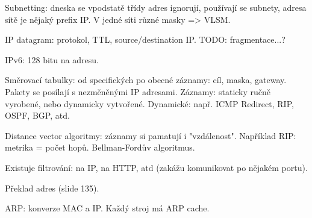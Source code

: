 \documentclass[a4paper,10pt,titlepage]{article} \usepackage[utf8]{inputenc}
\begin{document}
Subnetting: dneska se vpodstatě třídy adres ignorují, používají se subnety,
adresa sítě je nějaký prefix IP. V jedné síti různé masky => VLSM.

IP datagram: protokol, TTL, source/destination IP.
TODO: fragmentace...?

IPv6: 128 bitu na adresu.

Směrovací tabulky: od specifických po obecné záznamy: cíl, maska, gateway.
Pakety se posílají s nezměněnými IP adresami.
Záznamy: staticky ručně vyrobené, nebo dynamicky vytvořené.
Dynamické: např. ICMP Redirect, RIP, OSPF, BGP, atd.

Distance vector algoritmy: záznamy si pamatují i "vzdálenost".
Například RIP: metrika = počet hopů. Bellman-Fordův algoritmus.

Existuje filtrování: na IP, na HTTP, atd (zakážu komunikovat po nějakém portu).

Překlad adres (slide 135).

ARP: konverze MAC a IP. Každý stroj má ARP cache.
\end{document}
